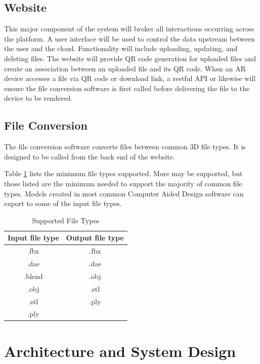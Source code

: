 \subsection{Website}
This major component of the system will broker all interactions occurring across the platform. A user interface will be used to control the data upstream between the user and the cloud. Functionality will include uploading, updating, and deleting files. The website will provide QR code generation for uploaded files and create an association between an uploaded file and its QR code. When an AR device accesses a file via QR code or download link, a restful API or likewise will ensure the file conversion software is first called before delivering the file to the device to be rendered.  


\subsection{File Conversion}
The file conversion software converts files between common 3D file types. It is designed to be called from the back end of the website.

Table \ref{table:suportedfiletypes} lists the minimum file types supported.  More may be supported, but those listed are the minimum needed to support the majority of common file types.  
Models created in most common Computer Aided Design software can export to some of the input file types.

\begin{table}[!h]
    \centering
    \begin{tabular}{| c | c |}
        \hline
        Input file type & Output file type \\
        \hline
        .fbx & .fbx \\
        .dae & .dae \\
        .blend & .obj \\ 
        .obj & .stl \\
        .stl & .ply \\
        .ply & \\
        \hline
    \end{tabular}
    \caption{Supported File Types}
    \label{table:suportedfiletypes}
\end{table}

 \section{Architecture and System Design}
 

